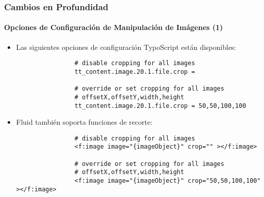 \begin{frame}[fragile]
	\frametitle{Cambios en Profundidad}
	\framesubtitle{Opciones de Configuración de Manipulación de Imágenes  (1)}

	\begin{itemize}
		\item Las siguientes opciones de configuración TypoScript están disponibles:
			\begin{lstlisting}
				# disable cropping for all images
				tt_content.image.20.1.file.crop =

				# override or set cropping for all images
				# offsetX,offsetY,width,height
				tt_content.image.20.1.file.crop = 50,50,100,100
			\end{lstlisting}

		\item Fluid también soporta funciones de recorte:
			\begin{lstlisting}
				# disable cropping for all images
				<f:image image="{imageObject}" crop="" ></f:image>

				# override or set cropping for all images
				# offsetX,offsetY,width,height
				<f:image image="{imageObject}" crop="50,50,100,100" ></f:image>
			\end{lstlisting}

	\end{itemize}

\end{frame}

